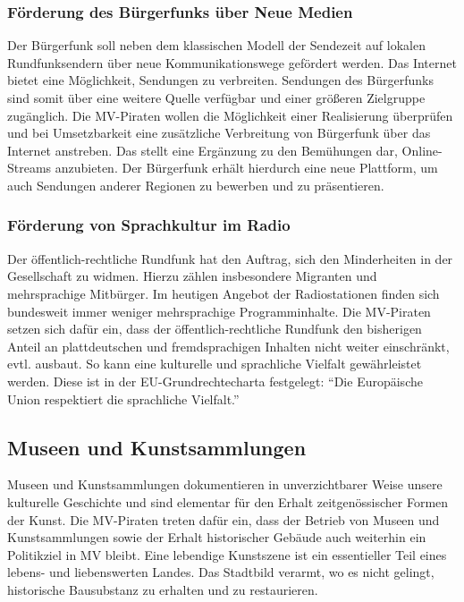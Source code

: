 \subsubsection{Förderung des Bürgerfunks über Neue Medien}

Der Bürgerfunk soll neben dem klassischen Modell der Sendezeit auf lokalen Rundfunksendern über neue Kommunikationswege gefördert werden. Das Internet bietet eine Möglichkeit, Sendungen zu verbreiten. Sendungen des Bürgerfunks sind somit über eine weitere Quelle verfügbar und einer größeren Zielgruppe zugänglich. Die MV-Piraten wollen die Möglichkeit einer Realisierung überprüfen und bei Umsetzbarkeit eine zusätzliche Verbreitung von Bürgerfunk über das Internet anstreben. Das stellt eine Ergänzung zu den Bemühungen dar, Online-Streams anzubieten. Der Bürgerfunk erhält hierdurch eine neue Plattform, um auch Sendungen anderer Regionen zu bewerben und zu präsentieren.

\subsubsection{Förderung von Sprachkultur im Radio}

Der öffentlich-rechtliche Rundfunk hat den Auftrag, sich den Minderheiten in der Gesellschaft zu widmen. Hierzu zählen insbesondere Migranten und mehrsprachige Mitbürger. Im heutigen Angebot der Radiostationen finden sich bundesweit immer weniger mehrsprachige Programminhalte. Die MV-Piraten setzen sich dafür ein, dass der öffentlich-rechtliche Rundfunk den bisherigen Anteil an plattdeutschen und fremdsprachigen Inhalten nicht weiter einschränkt, evtl. ausbaut. So kann eine kulturelle und sprachliche Vielfalt gewährleistet werden. Diese ist in der EU-Grundrechtecharta festgelegt: ``Die Europäische Union respektiert die sprachliche Vielfalt.''

\subsection{Museen und Kunstsammlungen}

Museen und Kunstsammlungen dokumentieren in unverzichtbarer Weise unsere kulturelle Geschichte und sind elementar für den Erhalt zeitgenössischer Formen der Kunst. Die MV-Piraten treten dafür ein, dass der Betrieb von Museen und Kunstsammlungen sowie der Erhalt historischer Gebäude auch weiterhin ein Politikziel in MV bleibt. Eine lebendige Kunstszene ist ein essentieller Teil eines lebens- und liebenswerten Landes. Das Stadtbild verarmt, wo es nicht gelingt, historische Bausubstanz zu erhalten und zu restaurieren.

